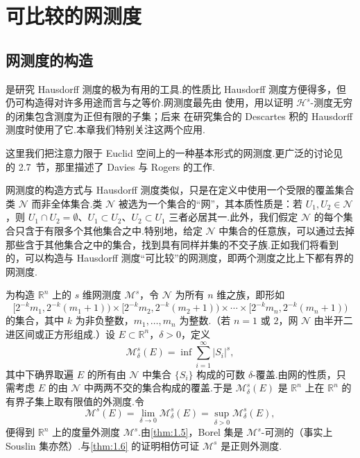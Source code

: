 
\chapter{可比较的网测度}\label{chap:5}

\section{网测度的构造}

是研究 Hausdorff 测度的极为有用的工具.的性质比 Hausdorff 测度方便得多，但仍可构造得对许多用途而言与之等价.网测度最先由 \textcite{besicovitch1952} 使用，用以证明 $\mathcal{H}^s$-测度无穷的闭集包含测度为正但有限的子集；后来 \textcite{marstrand1954b} 在研究集合的 Descartes 积的 Hausdorff 测度时使用了它.本章我们特别关注这两个应用.

这里我们把注意力限于 Euclid 空间上的一种基本形式的网测度.更广泛的讨论见 \textcite{rogers1970} 的 2.7~节，那里描述了 Davies 与 Rogers 的工作.

网测度的构造方式与 Hausdorff 测度类似，只是在定义中使用一个受限的覆盖集合类 $\mathcal{N}$ 而非全体集合.类 $\mathcal{N}$ 被选为一个集合的``网''，其本质性质是：若 $U_1,U_2\in\mathcal{N}$，则 $U_1\cap U_2=\emptyset$、$U_1\subset U_2$、$U_2\subset U_1$ 三者必居其一.此外，我们假定 $\mathcal{N}$ 的每个集合只含于有限多个其他集合之中.特别地，给定 $\mathcal{N}$ 中集合的任意族，可以通过去掉那些含于其他集合之中的集合，找到具有同样并集的不交子族.正如我们将看到的，可以构造与 Hausdorff 测度``可比较''的网测度，即两个测度之比上下都有界的网测度.

为构造 $\mathbb{R}^n$ 上的 $s$ 维网测度 $\mathcal{M}^s$，令 $\mathcal{N}$ 为所有 $n$ 维之族，即形如
\[
  [2^{-k}m_1,2^{-k}(m_1+1))\times[2^{-k}m_2,2^{-k}(m_2+1))\times\cdots\times[2^{-k}m_n,2^{-k}(m_n+1))
\]
的集合，其中 $k$ 为非负整数，$m_1,\ldots,m_n$ 为整数.（若 $n=1$ 或 $2$，网 $\mathcal{N}$ 由半开二进区间或正方形组成.）设 $E\subset\mathbb{R}^n$，$\delta>0$，定义
\begin{equation}\label{eq:5.1}
  \mathcal{M}^{s}_{\delta}(E)=\inf\sum_{i=1}^{\infty}|S_i|^{s},
\end{equation}
其中下确界取遍 $E$ 的所有由 $\mathcal{N}$ 中集合 $\{S_i\}$ 构成的可数 $\delta$-覆盖.由网的性质，只需考虑 $E$ 的由 $\mathcal{N}$ 中两两不交的集合构成的覆盖.于是 $\mathcal{M}^s_{\delta}(E)$ 是 $\mathbb{R}^n$ 上在 $\mathbb{R}^n$ 的有界子集上取有限值的外测度.令
\[
  \mathcal{M}^{s}(E)=\lim_{\delta\to 0}\mathcal{M}^{s}_{\delta}(E)=\sup_{\delta>0}\mathcal{M}^{s}_{\delta}(E),
\]
便得到 $\mathbb{R}^n$ 上的度量外测度 $\mathcal{M}^s$.由\cref{thm:1.5}，Borel 集是 $\mathcal{M}^s$-可测的（事实上 Souslin 集亦然）.与\cref{thm:1.6} 的证明相仿可证 $\mathcal{M}^s$ 是正则外测度.

